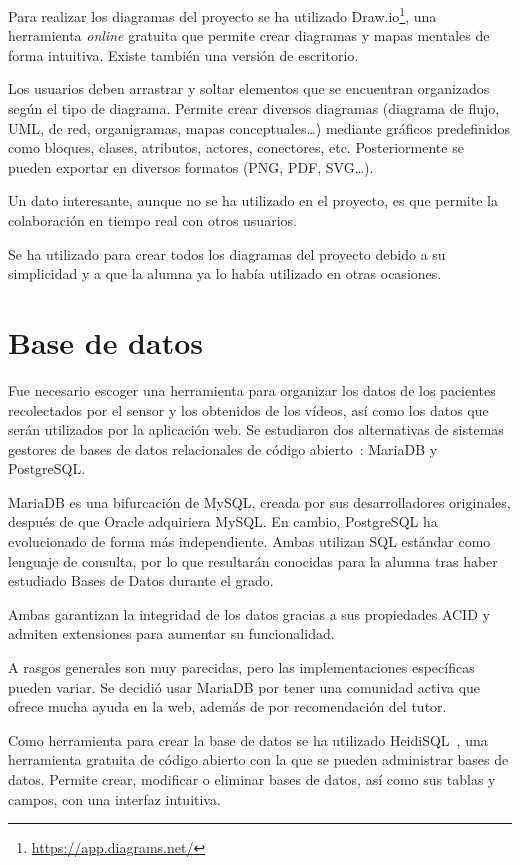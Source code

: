 Para realizar los diagramas del proyecto se ha utilizado Draw.io\footnote{\url{https://app.diagrams.net/}}, una herramienta \textit{online} gratuita que permite crear diagramas y mapas mentales de forma intuitiva. Existe también una versión de escritorio.

Los usuarios deben arrastrar y soltar elementos que se encuentran organizados según el tipo de diagrama. Permite crear diversos diagramas (diagrama de flujo, UML, de red, organigramas, mapas conceptuales\ldots) mediante gráficos predefinidos como bloques, clases, atributos, actores, conectores, etc. Posteriormente se pueden exportar en diversos formatos (PNG, PDF, SVG\ldots).

Un dato interesante, aunque no se ha utilizado en el proyecto, es que permite la colaboración en tiempo real con otros usuarios.

Se ha utilizado para crear todos los diagramas del proyecto debido a su simplicidad y a que la alumna ya lo había utilizado en otras ocasiones.





\section{Base de datos}
Fue necesario escoger una herramienta para organizar los datos de los pacientes recolectados por el sensor y los obtenidos de los vídeos, así como los datos que serán utilizados por la aplicación web. Se estudiaron dos alternativas de sistemas gestores de bases de datos relacionales de código abierto~\cite{bbdd}: MariaDB y PostgreSQL.

MariaDB es una bifurcación de MySQL, creada por sus desarrolladores originales, después de que Oracle adquiriera MySQL. En cambio, PostgreSQL ha evolucionado de forma más independiente.
Ambas utilizan SQL estándar como lenguaje de consulta, por lo que resultarán conocidas para la alumna tras haber estudiado Bases de Datos durante el grado.

Ambas garantizan la integridad de los datos gracias a sus propiedades ACID y admiten extensiones para aumentar su funcionalidad.

A rasgos generales son muy parecidas, pero las implementaciones específicas pueden variar. Se decidió usar MariaDB por tener una comunidad activa que ofrece mucha ayuda en la web, además de por recomendación del tutor.

Como herramienta para crear la base de datos se ha utilizado HeidiSQL~\cite{heidiSQL}, una herramienta gratuita de código abierto con la que se pueden administrar bases de datos. Permite crear, modificar o eliminar bases de datos, así como sus tablas y campos, con una interfaz intuitiva.






